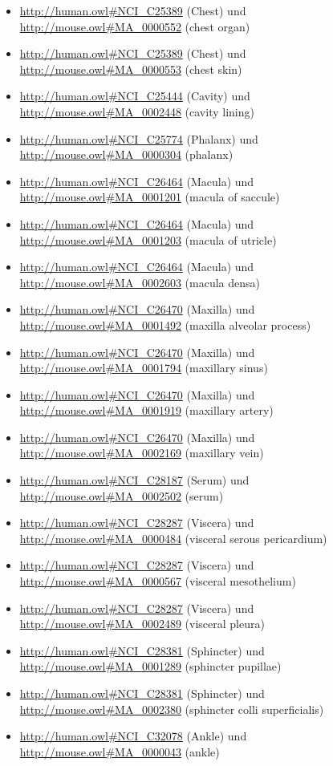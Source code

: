 \begin{itemize}
	\item \url{http://human.owl#NCI_C25389} (Chest) und \url{http://mouse.owl#MA_0000552} (chest organ)
	\item \url{http://human.owl#NCI_C25389} (Chest) und \url{http://mouse.owl#MA_0000553} (chest skin)
	\item \url{http://human.owl#NCI_C25444} (Cavity) und \url{http://mouse.owl#MA_0002448} (cavity lining)
	\item \url{http://human.owl#NCI_C25774} (Phalanx\textunderscoreof\textunderscorethe\textunderscoreFoot) und \url{http://mouse.owl#MA_0000304} (phalanx)
	\item \url{http://human.owl#NCI_C26464} (Macula) und \url{http://mouse.owl#MA_0001201} (macula of saccule)
	\item \url{http://human.owl#NCI_C26464} (Macula) und \url{http://mouse.owl#MA_0001203} (macula of utricle)
	\item \url{http://human.owl#NCI_C26464} (Macula) und \url{http://mouse.owl#MA_0002603} (macula densa)
	\item \url{http://human.owl#NCI_C26470} (Maxilla) und \url{http://mouse.owl#MA_0001492} (maxilla alveolar process)
	\item \url{http://human.owl#NCI_C26470} (Maxilla) und \url{http://mouse.owl#MA_0001794} (maxillary sinus)
	\item \url{http://human.owl#NCI_C26470} (Maxilla) und \url{http://mouse.owl#MA_0001919} (maxillary artery)
	\item \url{http://human.owl#NCI_C26470} (Maxilla) und \url{http://mouse.owl#MA_0002169} (maxillary vein)
	\item \url{http://human.owl#NCI_C28187} (Serum\textunderscoreAlbumin) und \url{http://mouse.owl#MA_0002502} (serum)
	\item \url{http://human.owl#NCI_C28287} (Viscera) und \url{http://mouse.owl#MA_0000484} (visceral serous pericardium)
	\item \url{http://human.owl#NCI_C28287} (Viscera) und \url{http://mouse.owl#MA_0000567} (visceral mesothelium)
	\item \url{http://human.owl#NCI_C28287} (Viscera) und \url{http://mouse.owl#MA_0002489} (visceral pleura)
	\item \url{http://human.owl#NCI_C28381} (Sphincter) und \url{http://mouse.owl#MA_0001289} (sphincter pupillae)
	\item \url{http://human.owl#NCI_C28381} (Sphincter) und \url{http://mouse.owl#MA_0002380} (sphincter colli superficialis)
	\item \url{http://human.owl#NCI_C32078} (Ankle\textunderscoreJoint) und \url{http://mouse.owl#MA_0000043} (ankle)

\end{itemize}
